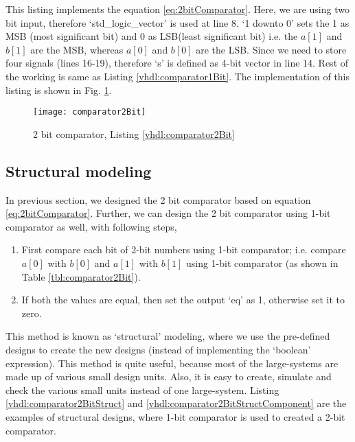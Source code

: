 \begin{explanation} 
This listing implements the equation \ref{eq:2bitComparator}. Here, we are using two bit input, therefore `std\_logic\_vector' is used at line 8. `1 downto 0' sets the 1 as MSB (most significant bit) and 0 as LSB(least significant bit) i.e. the $a[1]$ and $b[1]$ are the MSB, whereas $a[0]$ and $b[0]$ are the LSB. Since we need to store four signals (lines 16-19), therefore `s' is defined as 4-bit vector in line 14. Rest of the working is same as Listing \ref{vhdl:comparator1Bit}. The implementation of this listing is shown in Fig. \ref{fig:comparator2Bit}. 
\end{explanation}

\begin{figure}[!h]
	\centering
	\texttt{[image: comparator2Bit]}
	\caption{2 bit comparator, Listing \ref{vhdl:comparator2Bit}}
	\label{fig:comparator2Bit}
\end{figure}

\subsection{Structural modeling}\label{sec:structureModeling}
In previous section, we designed the 2 bit comparator based on equation \ref{eq:2bitComparator}. Further, we can design the 2 bit comparator using 1-bit comparator as well, with following steps, 
\begin{enumerate}
	\item First compare each bit of 2-bit numbers using 1-bit comparator;  i.e. compare $a[0]$ with $b[0]$ and $a[1]$ with $b[1]$ using 1-bit comparator (as shown in Table \ref{tbl:comparator2Bit}). 
	
	\item If both the values are equal, then set the output `eq' as 1, otherwise set it to zero. 
\end{enumerate}

This method is known as `structural' modeling, where we use the pre-defined designs to create the new designs (instead of implementing the `boolean' expression). This method is quite useful, because most of the large-systems are made up of various small design units. Also, it is easy to create, simulate and check the various small units instead of one large-system. Listing \ref {vhdl:comparator2BitStruct} and \ref{vhdl:comparator2BitStructComponent} are the examples of structural designs, where 1-bit comparator is used to created a 2-bit comparator.  


